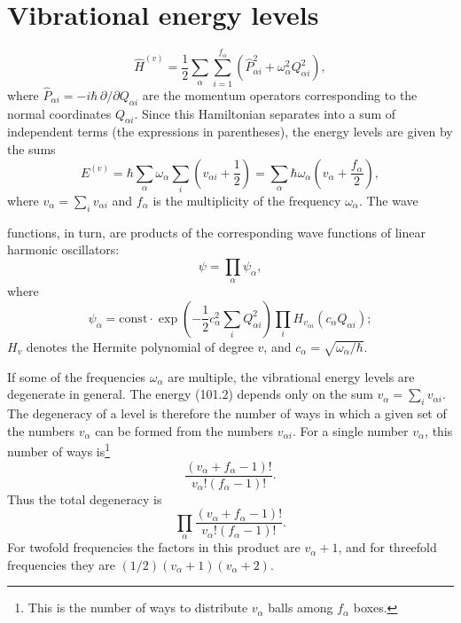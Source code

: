 \section{Vibrational energy levels}


\begin{equation}
 \widehat H^{(v)}=\frac12\sum_\alpha\sum_{i=1}^{f_\alpha}
 \left(\widehat P_{\alpha i}^{2}+\omega_\alpha^2Q_{\alpha i}^2\right),
 \tag{101.1}
\end{equation}
where $\widehat P_{\alpha i}=-i\hbar\,\partial/\partial Q_{\alpha i}$ are the
momentum operators corresponding to the normal coordinates
$Q_{\alpha i}$. Since this Hamiltonian separates into a sum of independent
terms (the expressions in parentheses), the energy levels are given by the
sums
\begin{equation}
 E^{(v)}=\hbar\sum_\alpha\omega_\alpha\sum_i\left(v_{\alpha i}+\frac12\right)
 =\sum_\alpha\hbar\omega_\alpha\left(v_\alpha+\frac{f_\alpha}{2}\right),
 \tag{101.2}
\end{equation}
where $v_\alpha=\sum_i v_{\alpha i}$ and $f_\alpha$ is the multiplicity of the
frequency $\omega_\alpha$. The wave

functions, in turn, are products of the corresponding wave functions of
linear harmonic oscillators:
\begin{equation}
 \psi=\prod_\alpha\psi_\alpha,
 \tag{101.3}
\end{equation}
where
\begin{equation}
 \psi_\alpha=\mathrm{const}\cdot\exp\left(-\frac12c_\alpha^2\sum_iQ_{\alpha i}^2\right)
 \prod_iH_{v_{\alpha i}}(c_\alpha Q_{\alpha i});
 \tag{101.4}
\end{equation}
$H_v$ denotes the Hermite polynomial of degree $v$, and
$c_\alpha=\sqrt{\omega_\alpha/\hbar}$.

If some of the frequencies $\omega_\alpha$ are multiple, the vibrational
energy levels are degenerate in general. The energy (101.2) depends only on the
sum $v_\alpha=\sum_i v_{\alpha i}$. The degeneracy of a level is therefore the
number of ways in which a given set of the numbers $v_\alpha$ can be formed
from the numbers $v_{\alpha i}$. For a single number $v_\alpha$, this number of
ways is\footnote{This is the number of ways to distribute $v_\alpha$ balls
among $f_\alpha$ boxes.}
\[
 \frac{(v_\alpha+f_\alpha-1)!}{v_\alpha!(f_\alpha-1)!}.
\]
Thus the total degeneracy is
\begin{equation}
 \prod_\alpha\frac{(v_\alpha+f_\alpha-1)!}{v_\alpha!(f_\alpha-1)!}.
 \tag{101.5}
\end{equation}
For twofold frequencies the factors in this product are $v_\alpha+1$, and for
threefold frequencies they are $(1/2)(v_\alpha+1)(v_\alpha+2)$.

